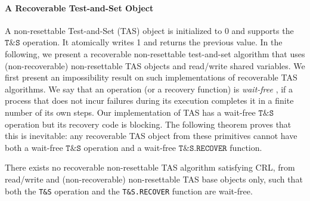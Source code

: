 \paragraph*{A Recoverable Test-and-Set Object}

A non-resettable Test-and-Set (TAS) object is initialized to 0 and supports the $\texttt{T\&S}$ operation. It atomically writes 1 and returns the previous value. In the following, we present a recoverable non-resettable test-and-set algorithm that uses (non-recoverable) non-resettable TAS objects and read/write shared variables. We first present an impossibility result on such implementations of recoverable TAS algorithms. We say that an operation (or a recovery function) is \emph{wait-free} \cite{herlihy91waitfree}, if a process that does not incur failures during its execution completes it in a finite number of its own steps. Our implementation of TAS has a wait-free $\texttt{T\&S}$ operation but its recovery code is blocking. The following theorem proves that this is inevitable: any recoverable TAS object from these primitives cannot have both a wait-free $\texttt{T\&S}$ operation and a wait-free $\texttt{T\&S.RECOVER}$ function.

\begin{theorem}
	There exists no recoverable non-resettable TAS algorithm satisfying CRL, from read/write and (non-recoverable) non-resettable TAS base objects only, such that both the \texttt{T\&S} operation and the \texttt{T\&S.RECOVER} function are wait-free.
\end{theorem}

